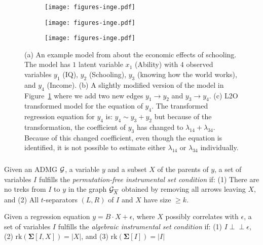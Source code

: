 \documentclass{beamer}
\def\ci{\perp\!\!\!\!\!\perp}
\begin{document}
\begin{frame}
	\frametitle{}
\begin{figure}[t]
	\centering
	\begin{subfigure}[b]{0.33 \linewidth}
		\centering
		\texttt{[image: figures-inge.pdf]}
		\caption{}
		\label{fig:example_original_model}
	\end{subfigure}%
	\begin{subfigure}[b]{0.33 \linewidth}
		\centering
		\texttt{[image: figures-inge.pdf]}
		\caption{}
		\label{fig:example_incorrect_estimate}
	\end{subfigure}%
	\begin{subfigure}[b]{0.33 \linewidth}
		\centering
		\texttt{[image: figures-inge.pdf]}
		\caption{}
		\label{fig:transform_incorrect_estimate}
	\end{subfigure}%
	\caption{(a) An example model from 
	about the economic effects of schooling. The model has $ 1 $ latent
	variable $x_1$ (Ability) with $ 4 $ observed variables $ y_1 $ (IQ), $
	y_2 $ (Schooling), $ y_3 $ (knowing how the world works), and $ y_4 $
	(Income). (b) A slightly modified version of the model in
	Figure~\ref{fig:example_original_model} where we add two new edges $ y_1
	\rightarrow y_2 $ and $ y_3 \rightarrow y_4 $.  (c) L2O transformed
	model for the equation of $ y_4 $. The transformed regression equation
	for $ y_4 $ is: $ y_4 \sim y_3 + y_2 $ but because of the
	transformation, the coefficient of $ y_3 $ has changed
	to $ \lambda_{14} + \lambda_{34} $. Because of this changed
	coefficient, even though the equation is identified, it is not possible
	to estimate either $ \lambda_{14} $ or $ \lambda_{34} $ individually.
	}
\label{fig:examples5}
\end{figure}
\end{frame}

\begin{frame}
	\frametitle{}
		\begin{definition}
		\label{defn:graphicistrek}
			Given an ADMG $\cal G$, a variable $y$ and a subset $X$ of the parents
			of $y$, a set of variables $I$ fulfills the \emph{permutation-free
			instrumental set condition} if: (1) There are no treks from $I$ to $y$
			in the graph ${\cal G}_{\overline{X}}$ obtained by removing all arrows
			leaving $X$, and (2) All $t$-separators $(L,R)$ of $I$ and $X$ have
			size $\geq k$. 
		\end{definition}

		\begin{definition}
			\label{defn:algebraicis}
			Given a regression equation $y = B \cdot X + \epsilon$, where $X$ possibly
			correlates with $\epsilon$, a set of variables
			$I$ fulfills the \emph{algebraic instrumental set condition} if: (1) $I \ci \epsilon$,
			(2) $\textrm{rk}(\bm{\Sigma}[I,X]) = |X|$, and (3) $\textrm{rk}(\bm{\Sigma}[I]) = |I|$
		\end{definition}
\end{frame}
\end{document}
